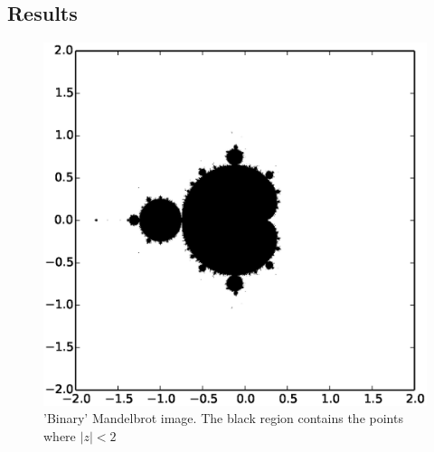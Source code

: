 \documentclass[11pt]{article}
\begin{document}
\subsection*{Results}
\begin{figure}[H]
  \centering
  \begin{minipage}[t]{0.5\textwidth}
    \centering
    \includegraphics[width=\linewidth]{mandel_1.eps}
    \caption{\scriptsize 'Binary' Mandelbrot image. The black region contains the points where $|z|<2$}
    \label{fig:elevels}
   \end{minipage}
\end{figure}
\end{document}

